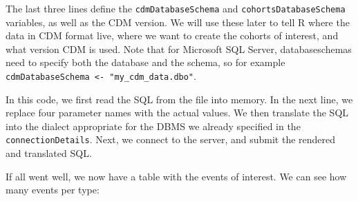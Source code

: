 \documentclass[]{book}
\newenvironment{Shaded}{\begin{snugshade}}{\end{snugshade}}
\newcommand{\KeywordTok}[1]{\textcolor[rgb]{0.13,0.29,0.53}{\textbf{#1}}}
\newcommand{\DataTypeTok}[1]{\textcolor[rgb]{0.13,0.29,0.53}{#1}}
\newcommand{\DecValTok}[1]{\textcolor[rgb]{0.00,0.00,0.81}{#1}}
\newcommand{\StringTok}[1]{\textcolor[rgb]{0.31,0.60,0.02}{#1}}
\newcommand{\OperatorTok}[1]{\textcolor[rgb]{0.81,0.36,0.00}{\textbf{#1}}}
\newcommand{\NormalTok}[1]{#1}
\begin{document}
The last three lines define the \texttt{cdmDatabaseSchema} and
\texttt{cohortsDatabaseSchema} variables, as well as the CDM version. We
will use these later to tell R where the data in CDM format live, where
we want to create the cohorts of interest, and what version CDM is used.
Note that for Microsoft SQL Server, databaseschemas need to specify both
the database and the schema, so for example
\texttt{cdmDatabaseSchema\ \textless{}-\ "my\_cdm\_data.dbo"}.

\begin{Shaded}
\end{Shaded}

In this code, we first read the SQL from the file into memory. In the
next line, we replace four parameter names with the actual values. We
then translate the SQL into the dialect appropriate for the DBMS we
already specified in the \texttt{connectionDetails}. Next, we connect to
the server, and submit the rendered and translated SQL.

If all went well, we now have a table with the events of interest. We
can see how many events per type:

\begin{Shaded}
\end{Shaded}
\end{document}
